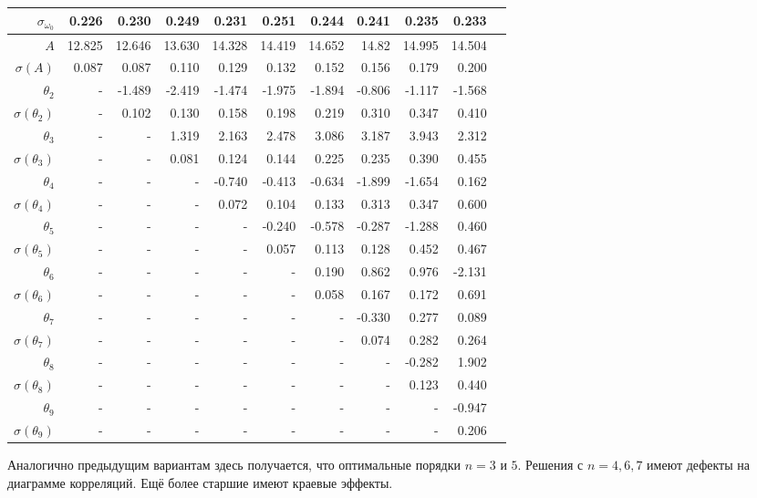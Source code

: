 \documentclass{matmex-diploma-custom}
\begin{document}
\begin{table}[h!!]
\begin{tabular}{r|rr|r|r|r|rrrrr}
 $\sigma_{\omega_0} $& 0.226       &     0.230 &   0.249 &   0.231 &   0.251 &   0.244 &    0.241 &   0.235 &   0.233 \\\hline
 $A $&12.825      &   12.646 &   13.630 &  14.328 &  14.419 &  14.652 &    14.82 &  14.995 &  14.504 \\
 $\sigma(A) $ & 0.087       &    0.087 &    0.110 &   0.129 &   0.132 &   0.152 &    0.156 &   0.179 &     0.200 \\
 $\theta_2$&-        &  -1.489 &  -2.419 &  -1.474 &  -1.975 &  -1.894 &   -0.806 &  -1.117 &  -1.568 \\
 $\sigma(\theta_2)$&-      &     0.102 &    0.130 &   0.158 &   0.198 &   0.219 &     0.310 &   0.347 &    0.410 \\
 $\theta_3$&-      &    - &   1.319 &   2.163 &   2.478 &   3.086 &    3.187 &   3.943 &   2.312 \\
 $\sigma(\theta_3)$&-      &    - &   0.081 &   0.124 &   0.144 &   0.225 &    0.235 &   0.390 &   0.455 \\
 $\theta_4$&-      &    - &    - &  -0.740 &  -0.413 &  -0.634 &   -1.899 &  -1.654 &   0.162 \\
 $\sigma(\theta_4)$&-      &    - &    - &     0.072 &   0.104 &   0.133 &    0.313 &   0.347 &   0.600 \\
 $\theta_5$&-      &    - &    - &    - &  -0.240 &  -0.578 &   -0.287 &  -1.288 &   0.460 \\
 $\sigma(\theta_5)$&-      &    - &    - &    - &     0.057 &   0.113 &    0.128 &   0.452 &   0.467 \\
 $\theta_6$&-      &    - &    - &    - &    - &   0.190 &    0.862 &   0.976 &  -2.131 \\
 $\sigma(\theta_6)$&-    &    - &    - &    - &    - &   0.058 &    0.167 &   0.172 &   0.691 \\
 $\theta_7$&-     &    - &    - &    - &    - &    - &  -0.330 &   0.277 &   0.089 \\
 $ \sigma(\theta_7)$&-     &    - &    - &    - &    - &    - &      0.074 &   0.282 &   0.264 \\
 $\theta_8$&-     &    - &    - &    - &    - &    - &    - &   -0.282 &   1.902 \\
 $ \sigma(\theta_8)$&-     &    - &    - &    - &    - &    - &    - &     0.123 &   0.440 \\
 $\theta_9$&-     &    - &    - &    - &    - &    - &    - &    - &  -0.947  \\
 $ \sigma(\theta_9)$&-     &    - &    - &    - &    - &    - &    - &    - &   0.206  \\
\end{tabular}
\end{table}
Аналогично предыдущим вариантам здесь получается, что оптимальные порядки $n=3$ и $5$. Решения с $n=4, 6, 7$ имеют дефекты на диаграмме корреляций. Ещё более старшие имеют краевые эффекты. 
\pagebreak
\end{document}
